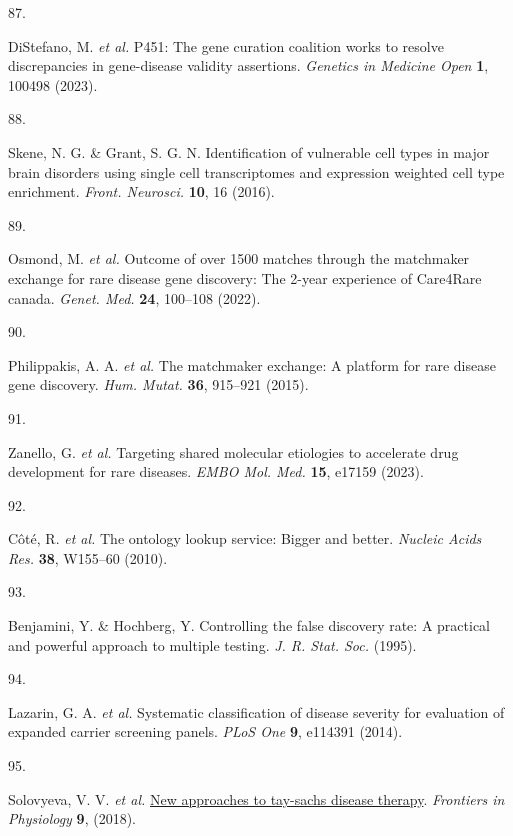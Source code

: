 \documentclass[
]{article}
\newlength{\cslhangindent}
\newlength{\csllabelwidth}
\newenvironment{CSLReferences}[2] %
 {\begin{list}{}{%
  \setlength{\itemindent}{0pt}
  \setlength{\leftmargin}{0pt}
  \setlength{\parsep}{0pt}
  \ifodd #1
   \setlength{\leftmargin}{\cslhangindent}
   \setlength{\itemindent}{-1\cslhangindent}
  \fi
  \setlength{\itemsep}{#2\baselineskip}}}
 {\end{list}}
\newcommand{\CSLLeftMargin}[1]{\parbox[t]{\csllabelwidth}{\strut#1\strut}}
\newcommand{\CSLRightInline}[1]{\parbox[t]{\linewidth - \csllabelwidth}{\strut#1\strut}}
\begin{document}
\begin{CSLReferences}{0}{0}
\CSLLeftMargin{87. }%
\CSLRightInline{DiStefano, M. \emph{et al.} P451: The gene curation
coalition works to resolve discrepancies in gene-disease validity
assertions. \emph{Genetics in Medicine Open} \textbf{1}, 100498 (2023).}

\CSLLeftMargin{88. }%
\CSLRightInline{Skene, N. G. \& Grant, S. G. N. Identification of
vulnerable cell types in major brain disorders using single cell
transcriptomes and expression weighted cell type enrichment.
\emph{Front. Neurosci.} \textbf{10}, 16 (2016).}

\CSLLeftMargin{89. }%
\CSLRightInline{Osmond, M. \emph{et al.} Outcome of over 1500 matches
through the matchmaker exchange for rare disease gene discovery: The
2-year experience of {Care4Rare} canada. \emph{Genet. Med.} \textbf{24},
100--108 (2022).}

\CSLLeftMargin{90. }%
\CSLRightInline{Philippakis, A. A. \emph{et al.} The matchmaker
exchange: A platform for rare disease gene discovery. \emph{Hum. Mutat.}
\textbf{36}, 915--921 (2015).}

\CSLLeftMargin{91. }%
\CSLRightInline{Zanello, G. \emph{et al.} Targeting shared molecular
etiologies to accelerate drug development for rare diseases. \emph{EMBO
Mol. Med.} \textbf{15}, e17159 (2023).}

\CSLLeftMargin{92. }%
\CSLRightInline{Côté, R. \emph{et al.} The ontology lookup service:
Bigger and better. \emph{Nucleic Acids Res.} \textbf{38}, W155--60
(2010).}

\CSLLeftMargin{93. }%
\CSLRightInline{Benjamini, Y. \& Hochberg, Y. Controlling the false
discovery rate: A practical and powerful approach to multiple testing.
\emph{J. R. Stat. Soc.} (1995).}

\CSLLeftMargin{94. }%
\CSLRightInline{Lazarin, G. A. \emph{et al.} Systematic classification
of disease severity for evaluation of expanded carrier screening panels.
\emph{PLoS One} \textbf{9}, e114391 (2014).}

\CSLLeftMargin{95. }%
\CSLRightInline{Solovyeva, V. V. \emph{et al.}
\href{https://doi.org/10.3389/fphys.2018.01663}{New approaches to
tay-sachs disease therapy}. \emph{Frontiers in Physiology} \textbf{9},
(2018).}


\end{CSLReferences}
\end{document}
